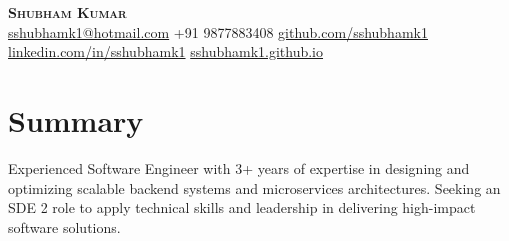 \documentclass[letterpaper,11pt]{article}
\newcommand{\cvskill}[2]{
  \textcolor{black}{\textbf{#1:}} {#2}\hfill \\
}
\begin{document}


\begin{center}
  \textbf{\LARGE\scshape Shubham Kumar} \\
  \vspace{1pt}\small
  \faAddressBook \href{mailto:}{ sshubhamk1@hotmail.com}
  \faMobile* +91 9877883408
  \faGithub  \href{https://github.com/sshubhamk1}{ github.com/sshubhamk1} \\
  \faLinkedin \href{https://www.linkedin.com/in/sshubhamk1}{ linkedin.com/in/sshubhamk1}
  \faHouseUser \href{https://sshubhamk1.github.io}{ sshubhamk1.github.io}
\end{center}



\section{Summary}
Experienced Software Engineer with 3+ years of expertise in designing and optimizing scalable backend systems and microservices architectures. Seeking an SDE 2 role to apply technical skills and leadership in delivering high-impact software solutions.

\end{document}
